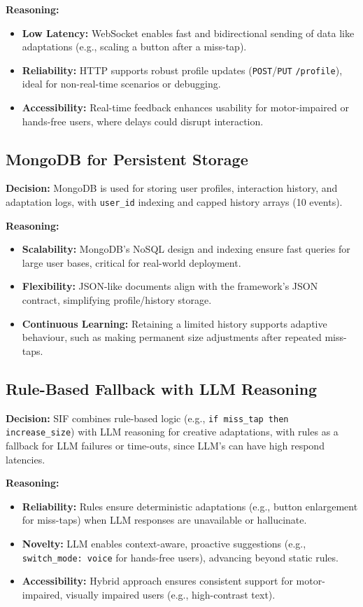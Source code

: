 \documentclass[openany]{book}
\begin{document}
\textbf{Reasoning:}
\begin{itemize}
    \item \textbf{Low Latency:} WebSocket enables fast and bidirectional sending of data like adaptations (e.g., scaling a button after a miss-tap).
    \item \textbf{Reliability:} HTTP supports robust profile updates (\texttt{POST}/\texttt{PUT} \texttt{/profile}), ideal for non-real-time scenarios or debugging.
    \item \textbf{Accessibility:} Real-time feedback enhances usability for motor-impaired or hands-free users, where delays could disrupt interaction. 
\end{itemize}

\subsection{MongoDB for Persistent Storage}
\textbf{Decision:} MongoDB is used for storing user profiles, interaction history, and adaptation logs, with \texttt{user\_id} indexing and capped history arrays (10 events).

\textbf{Reasoning:}
\begin{itemize}
  \item \textbf{Scalability:} MongoDB’s NoSQL design and indexing ensure fast queries for large user bases, critical for real-world deployment.
  \item \textbf{Flexibility:} JSON-like documents align with the framework’s JSON contract, simplifying profile/history storage.
  \item \textbf{Continuous Learning:} Retaining a limited history supports adaptive behaviour, such as making permanent size adjustments after repeated miss-taps.
\end{itemize}

\subsection{Rule-Based Fallback with LLM Reasoning}
\textbf{Decision:} SIF combines rule-based logic (e.g., \texttt{if miss\_tap then increase\_size}) with LLM reasoning for creative adaptations, with rules as a fallback for LLM failures or time-outs, since LLM's can have high respond latencies.

\textbf{Reasoning:}
\begin{itemize}
  \item \textbf{Reliability:} Rules ensure deterministic adaptations (e.g., button enlargement for miss-taps) when LLM responses are unavailable or hallucinate.
  \item \textbf{Novelty:} LLM enables context-aware, proactive suggestions (e.g., \verb|switch_mode: voice| for hands-free users), advancing beyond static rules.
  \item \textbf{Accessibility:} Hybrid approach ensures consistent support for motor-impaired, visually impaired users (e.g., high-contrast text).
\end{itemize}
\end{document}
